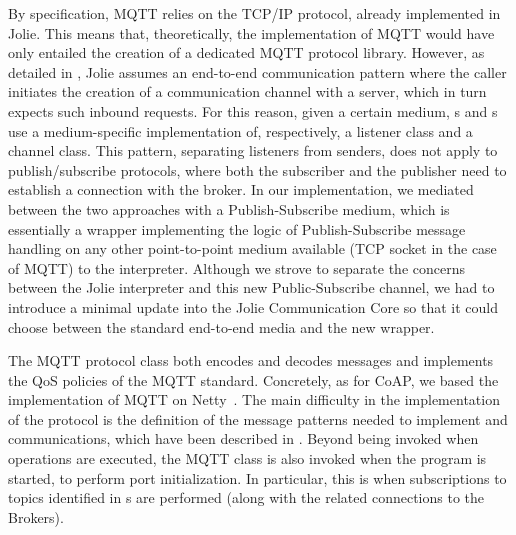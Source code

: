 By specification, MQTT relies on the TCP/IP protocol, already implemented in
Jolie. This means that, theoretically, the implementation of MQTT would have
only entailed the creation of a dedicated MQTT protocol library. However, as
detailed in , Jolie assumes an end-to-end
communication pattern where the caller initiates the creation of a
communication channel with a server, which in turn expects such inbound
requests. For this reason, given a certain medium, s and
s use a medium-specific implementation of, respectively, a
listener class and a channel class.
%
This pattern, separating listeners from senders, does not apply to
publish/subscribe protocols, where both the subscriber and the publisher need
to establish a connection with the broker. In our implementation, we mediated
between the two approaches with a Publish-Subscribe medium, which is
essentially a wrapper implementing the logic of Publish-Subscribe message
handling on any other point-to-point medium available (TCP socket in the case
of MQTT) to the interpreter. Although we strove to separate the concerns
between the Jolie interpreter and this new Public-Subscribe channel, we had to
introduce a minimal update into the Jolie \textsf{Communication Core} so that it could
choose between the standard end-to-end media and the new wrapper.

The MQTT protocol class both encodes and decodes messages and implements the QoS
policies of the MQTT standard. Concretely, as for CoAP, we based the
implementation of MQTT on Netty~\cite{maurer16}. The main difficulty in the
implementation of the protocol is the definition of the message patterns needed
to implement  and  communications, which have
been described in . Beyond being invoked when operations are executed, the
MQTT class is also invoked when the program is started, to perform port
initialization. In particular, this is when subscriptions to topics identified
in s are performed (along with the related connections to the
Brokers).
